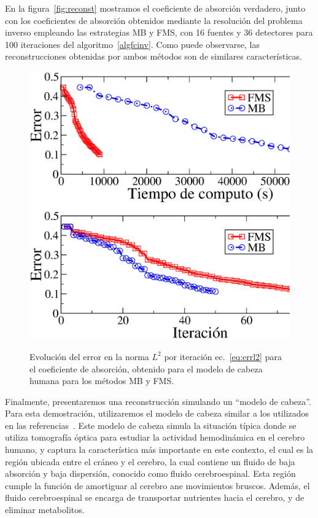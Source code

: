 En la figura~\ref{fig:reconst} mostramos el coeficiente de absorción verdadero, 
junto con los coeficientes de absorción obtenidos mediante la resolución del problema 
inverso empleando las estrategias MB y FMS, con 16 fuentes y 36 detectores 
para 100 iteraciones del algoritmo~\ref{algfcinv}. Como puede observarse, 
las reconstrucciones obtenidas por ambos métodos son de similares características. 
\begin{figure}[h!]
\centering
  \includegraphics[width=0.5\linewidth]{figuras/l2err.eps}\\
  \caption{Evolución del error en la norma $L^2$ por iteración ec.~\eqref{eq:errl2} para el coeficiente de absorción, obtenido para el modelo de cabeza humana para los métodos MB y FMS.}
 \label{fig:ithead}
\end{figure}
Finalmente, presentaremos una reconstrucción simulando un ``modelo de cabeza''. 
Para esta demostración, utilizaremos el modelo de cabeza similar 
a los utilizados en las referencias~\cite{Klose2002,Prieto2017}. 
Este modelo de cabeza simula la situación típica donde 
se utiliza tomografía óptica para estudiar la actividad hemodinámica 
en el cerebro humano, y captura la característica más importante 
en este contexto, el cual es la región ubicada entre el cráneo y el cerebro, 
la cual contiene un fluido de baja absorción y baja dispersión, conocido 
como fluido cerebroespinal. Esta región cumple la función de 
amortiguar al cerebro ane movimientos bruscos. Además, el fluido cerebroespinal 
se encarga de transportar nutrientes hacia el cerebro, y de
eliminar metabolitos.
